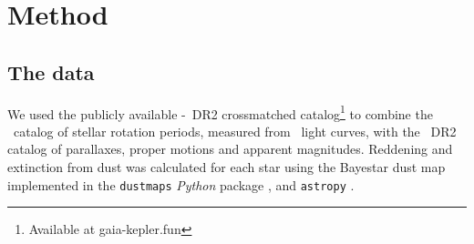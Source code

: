 
\section{Method}
\label{sec:method}

\subsection{The data}
\label{sec:the_data}

We used the publicly available \kepler-\gaia\ DR2 crossmatched
catalog\footnote{Available at gaia-kepler.fun} to combine the \mct\ catalog of
stellar rotation periods, measured from \kepler\ light curves, with the \gaia\
DR2 catalog of parallaxes, proper motions and apparent magnitudes.
Reddening and extinction from dust was calculated for each star using the
Bayestar dust map implemented in the {\tt dustmaps} {\it Python} package
\citep{green2018}, and {\tt astropy} \citep{astropy2013, astropy2018}.

